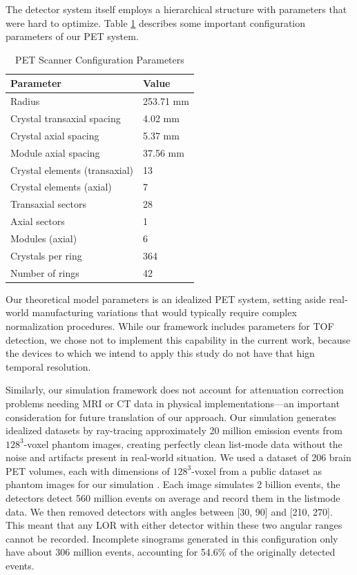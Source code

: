 \documentclass[
reprint,
superscriptaddress,
nofootinbib,
amsmath,amssymb,
aps,
prd,
]{revtex4-2}
\begin{document}
The detector system itself employs a hierarchical structure with parameters that were hard to optimize. Table \ref{tab:detector_params} describes some important configuration parameters of our PET system.

\begin{table}[htbp]
    \centering
    \caption{PET Scanner Configuration Parameters}
    \label{tab:detector_params}
    \begin{tabular}{l l}
    \toprule
    \textbf{Parameter} & \textbf{Value} \\
    \midrule
    Radius & 253.71 mm \\
    Crystal transaxial spacing & 4.02 mm \\
    Crystal axial spacing & 5.37 mm \\
    Module axial spacing & 37.56 mm \\
    Crystal elements (transaxial) & 13 \\
    Crystal elements (axial) & 7 \\
    Transaxial sectors & 28 \\
    Axial sectors & 1 \\
    Modules (axial) & 6 \\
    Crystals per ring & 364 \\
    Number of rings & 42 \\
    \bottomrule
    \end{tabular}
\end{table}

Our theoretical model parameters is an idealized PET system, setting aside real-world manufacturing variations that would typically require complex normalization procedures. 
While our framework includes parameters for TOF detection, we chose not to implement this capability in the current work, because the devices to which we intend to apply this study do not have that hign temporal resolution. 

Similarly, our simulation framework does not account for attenuation correction problems needing MRI or CT data in physical implementations—an important consideration for future translation of our approach. Our simulation generates idealized datasets by ray-tracing approximately 20 million emission events from $128^3$-voxel phantom images, creating perfectly clean list-mode data without the noise and artifacts present in real-world situation. 
We used a dataset of 206 brain PET volumes, each with dimensions of $128^3$-voxel from a public dataset as phantom images for our simulation \cite{Han2023DiffusionPET}. Each image simulates 2 billion events, the detectors detect 560 million events on average and record them in the listmode data. We then removed detectors with angles between [30\degree, 90\degree] and [210\degree, 270\degree]. This meant that any LOR with either detector within these two angular ranges cannot be recorded. Incomplete sinograms generated in this configuration only have about 306 million events, accounting for 54.6\% of the originally detected events.
\end{document}
